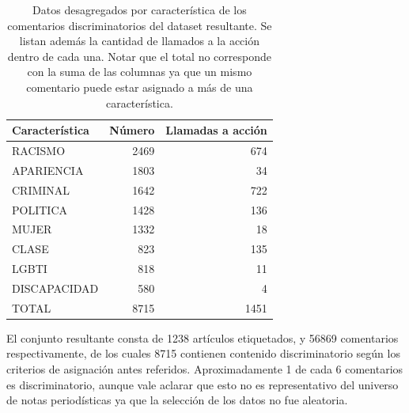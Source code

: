 \begin{table}
    \centering
    \begin{tabular}{lrr}
        \toprule
        Característica &  Número &  Llamadas a acción \\
        \midrule
        RACISMO        &   \num{2469} & \num{ 674} \\
        APARIENCIA     &   \num{1803} & \num{  34} \\
        CRIMINAL       &   \num{1642} & \num{ 722} \\
        POLITICA       &   \num{1428} & \num{ 136} \\
        MUJER          &   \num{1332} & \num{  18} \\
        CLASE          &   \num{ 823} & \num{ 135} \\
        LGBTI          &   \num{ 818} & \num{  11} \\
        DISCAPACIDAD   &   \num{ 580} & \num{   4} \\
        TOTAL          &   \num{8715} & \num{1451} \\
        \bottomrule
    \end{tabular}
    \caption{Datos desagregados por característica de los comentarios discriminatorios del dataset resultante. Se listan además la cantidad de llamados a la acción dentro de cada una. Notar que el total no corresponde con la suma de las columnas ya que un mismo comentario puede estar asignado a más de una característica.}
    \label{tab:dataset_figures}

\end{table}

El conjunto resultante consta de \num{1238} artículos etiquetados, y \num{56869} comentarios respectivamente, de los cuales \num{8715} contienen contenido discriminatorio según los criterios de asignación antes referidos. Aproximadamente 1 de cada 6 comentarios es discriminatorio, aunque vale aclarar que esto no es representativo del universo de notas periodísticas ya que la selección de los datos no fue aleatoria.


